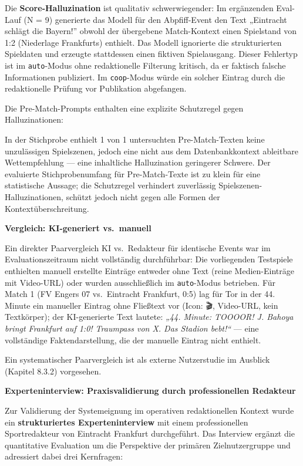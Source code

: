 Die \textbf{Score-Halluzination} ist qualitativ schwerwiegender: Im
ergänzenden Eval-Lauf (N = 9) generierte das Modell für den
Abpfiff-Event den Text „Eintracht schlägt die Bayern!'' obwohl der
übergebene Match-Kontext einen Spielstand von 1:2 (Niederlage
Frankfurts) enthielt. Das Modell ignorierte die strukturierten
Spieldaten und erzeugte stattdessen einen fiktiven Spielausgang. Dieser
Fehlertyp ist im \texttt{auto}-Modus ohne redaktionelle Filterung
kritisch, da er faktisch falsche Informationen publiziert. Im
\texttt{coop}-Modus würde ein solcher Eintrag durch die redaktionelle
Prüfung vor Publikation abgefangen.

Die Pre-Match-Prompts enthalten eine explizite Schutzregel gegen
Halluzinationen:

In der Stichprobe enthielt 1 von 1 untersuchten Pre-Match-Texten keine
unzulässigen Spielszenen, jedoch eine nicht aus dem Datenbankkontext
ableitbare Wettempfehlung --- eine inhaltliche Halluzination geringerer
Schwere. Der evaluierte Stichprobenumfang für Pre-Match-Texte ist zu
klein für eine statistische Aussage; die Schutzregel verhindert
zuverlässig Spielszenen-Halluzinationen, schützt jedoch nicht gegen alle
Formen der Kontextüberschreitung.

\textbf{Vergleich: KI-generiert vs.~manuell}

Ein direkter Paarvergleich KI vs.~Redakteur für identische Events war im
Evaluationszeitraum nicht vollständig durchführbar: Die vorliegenden
Testspiele enthielten manuell erstellte Einträge entweder ohne Text
(reine Medien-Einträge mit Video-URL) oder wurden ausschließlich im
\texttt{auto}-Modus betrieben. Für Match 1 (FV Engers 07 vs.~Eintracht
Frankfurt, 0:5) lag für Tor in der 44. Minute ein manueller Eintrag ohne
Fließtext vor (Icon: 🎬, Video-URL, kein Textkörper); der KI-generierte
Text lautete: \emph{„44. Minute: TOOOOR! J. Bahoya bringt Frankfurt auf
1:0! Traumpass von X. Das Stadion bebt!{\kern0pt}``} --- eine
vollständige Faktendarstellung, die der manuelle Eintrag nicht enthielt.

Ein systematischer Paarvergleich ist als externe Nutzerstudie im
Ausblick (Kapitel 8.3.2) vorgesehen.

\textbf{Experteninterview: Praxisvalidierung durch professionellen
Redakteur}

Zur Validierung der Systemeignung im operativen redaktionellen Kontext
wurde ein \textbf{strukturiertes Experteninterview} mit einem
professionellen Sportredakteur von Eintracht Frankfurt durchgeführt. Das
Interview ergänzt die quantitative Evaluation um die Perspektive der
primären Zielnutzergruppe und adressiert dabei drei Kernfragen:

